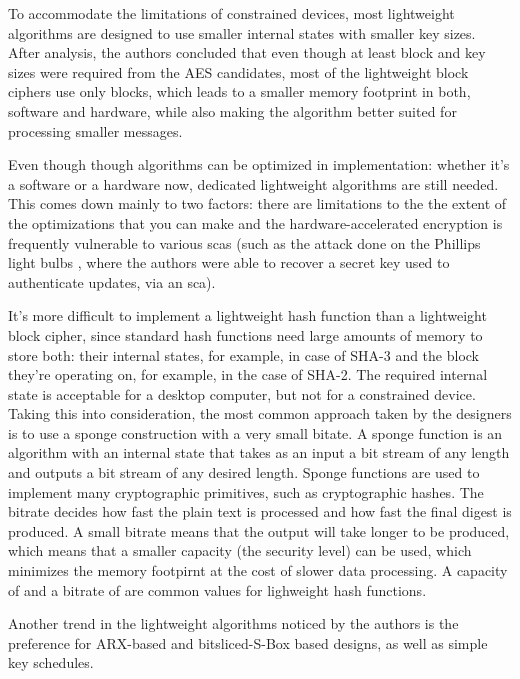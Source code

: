 \documentclass{llncs}
\begin{document}
To accommodate the limitations of constrained devices, most lightweight algorithms
are designed to use smaller internal states with smaller key sizes. After analysis,
the authors concluded that even though at least  block and
key sizes were required from the AES candidates, most of the lightweight
block ciphers use only  blocks, which leads to a smaller memory
footprint in both, software and hardware, while also making the algorithm better suited
for processing smaller messages.

Even though though algorithms can be optimized in implementation: whether it's
a software or a hardware now, dedicated lightweight algorithms are still needed.
This comes down mainly to two factors: there are limitations to the the extent of
the optimizations that you can make and the hardware-accelerated encryption is
frequently vulnerable to various \gls{sca}s (such as the attack done on the
Phillips light bulbs \cite{cryptoeprint:2016:1047}, where the authors were able to
recover a secret key used to authenticate updates, via an \gls{sca}).

It's more difficult to implement a lightweight hash function than a lightweight
block cipher, since standard hash functions need large amounts
of memory to store both: their internal states, for example,  in case of SHA-3
and the block they're operating on, for example,  in the case of SHA-2.
The required internal state is acceptable for a desktop computer, but not for a
constrained device. Taking this into consideration, the most common approach
taken by the designers is to use a sponge construction with a very small bitate.
A sponge function is an algorithm with an internal state that takes as an input
a bit stream of any length and outputs a bit stream of any desired length. Sponge
functions are used to implement many cryptographic primitives, such as cryptographic
hashes. The bitrate decides how fast the plain text is processed and how fast the
final digest is produced. A small bitrate means that the output will take longer
to be produced, which means that a smaller capacity (the security level)
can be used, which minimizes the memory footpirnt at the cost of slower data
processing. A capacity of  and a bitrate of 
are common values for lighweight hash functions.

Another trend in the lightweight algorithms noticed by the authors is the
preference for ARX-based and bitsliced-S-Box based designs, as well as simple
key schedules.
\end{document}
